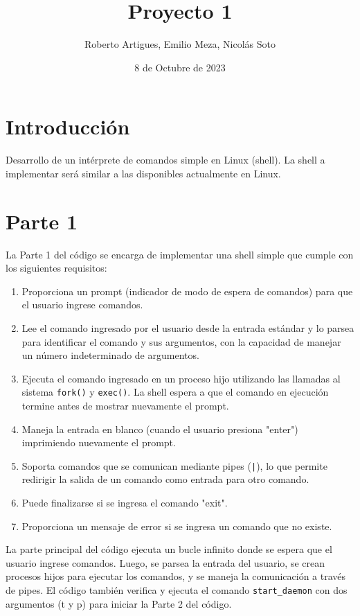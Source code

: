 \documentclass[12pt]{article}
\begin{document}
\title{Proyecto 1}
\author{Roberto Artigues, Emilio Meza, Nicolás Soto}
\date{8 de Octubre de 2023}
\maketitle


\section{Introducción}
Desarrollo de un intérprete de comandos simple en Linux (shell). La shell a implementar será similar
a las disponibles actualmente en Linux.
\section{Parte 1}

La Parte 1 del código se encarga de implementar una shell simple que cumple con los siguientes requisitos:

\begin{enumerate}
\item Proporciona un prompt (indicador de modo de espera de comandos) para que el usuario ingrese comandos.
\item Lee el comando ingresado por el usuario desde la entrada estándar y lo parsea para identificar el comando y sus argumentos, con la capacidad de manejar un número indeterminado de argumentos.
\item Ejecuta el comando ingresado en un proceso hijo utilizando las llamadas al sistema \texttt{fork()} y \texttt{exec()}. La shell espera a que el comando en ejecución termine antes de mostrar nuevamente el prompt.
\item Maneja la entrada en blanco (cuando el usuario presiona "enter") imprimiendo nuevamente el prompt.
\item Soporta comandos que se comunican mediante pipes (\texttt{|}), lo que permite redirigir la salida de un comando como entrada para otro comando.
\item Puede finalizarse si se ingresa el comando "exit".
\item Proporciona un mensaje de error si se ingresa un comando que no existe.
\end{enumerate}

La parte principal del código ejecuta un bucle infinito donde se espera que el usuario ingrese comandos. Luego, se parsea la entrada del usuario, se crean procesos hijos para ejecutar los comandos, y se maneja la comunicación a través de pipes. El código también verifica y ejecuta el comando \texttt{start\_daemon} con dos argumentos (t y p) para iniciar la Parte 2 del código.
\end{document}
